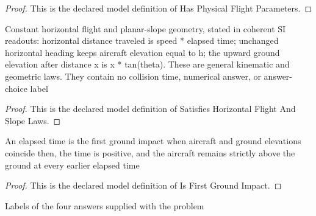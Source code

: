 \begin{proof}
  This is the declared model definition of Has Physical Flight Parameters.
\end{proof}
\begin{definition}
  \label{def:physics:phyx-mini-0731:phyxminiproblems-problemphyxmini0731-satisfieshorizontalflightandslopelaws}
  Constant horizontal flight and planar-slope geometry, stated in coherent SI readouts: horizontal distance traveled is speed * elapsed time; unchanged horizontal heading keeps aircraft elevation equal to h; the upward ground elevation after distance x is x * tan(theta). These are general kinematic and geometric laws. They contain no collision time, numerical answer, or answer-choice label
\end{definition}
\begin{proof}
  This is the declared model definition of Satisfies Horizontal Flight And Slope Laws.
\end{proof}
\begin{definition}
  \label{def:physics:phyx-mini-0731:phyxminiproblems-problemphyxmini0731-isfirstgroundimpact}
  An elapsed time is the first ground impact when aircraft and ground elevations coincide then, the time is positive, and the aircraft remains strictly above the ground at every earlier elapsed time
\end{definition}
\begin{proof}
  This is the declared model definition of Is First Ground Impact.
\end{proof}
\begin{definition}
  \label{def:physics:phyx-mini-0731:phyxminiproblems-problemphyxmini0731-answerchoice}
  Labels of the four answers supplied with the problem
\end{definition}

